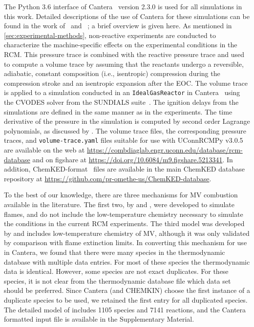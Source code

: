 \documentclass[letterpaper, review, sort&compress]{elsarticle}
\begin{document}
The Python 3.6 interface of Cantera~\cite{cantera} version 2.3.0 is used for all simulations in this
work. Detailed descriptions of the use of Cantera for these simulations can be found in the work
of~\citet{Weber2016a} and~ \citet{Dames2016}; a brief overview is given here. As mentioned in
\cref{sec:experimental-methods}, non-reactive experiments are conducted to characterize the
machine-specific effects on the experimental conditions in the RCM. This pressure trace is combined
with the reactive pressure trace and used to compute a volume trace by assuming that the reactants
undergo a reversible, adiabatic, constant composition (i.e., isentropic) compression during the
compression stroke and an isentropic expansion after the EOC. The volume trace is applied to a
simulation conducted in an \verb|IdealGasReactor| in Cantera~\cite{cantera} using the CVODES solver
from the SUNDIALS suite~\cite{Hindmarsh2005}. The ignition delays from the simulations are defined
in the same manner as in the experiments. The time derivative of the pressure in the simulation is
computed by second order Lagrange polynomials, as discussed by \citet{Chapra2010}. The volume trace
files, the corresponding pressure traces, and \texttt{volume-trace.yaml} files suitable for use with
UConnRCMPy v3.0.5~\cite{uconnrcmpy} are available on the web at
\url{https://combdiaglab.engr.uconn.edu/database/rcm-database} and on figshare at
\url{https://doi.org/10.6084/m9.figshare.5213341}. In addition, ChemKED-format~\cite{Weber2017}
files are available in the main ChemKED database repository at
\url{https://github.com/pr-omethe-us/ChemKED-database}.


To the best of our knowledge, there are three mechanisms for MV combustion available in the
literature. The first two, by \citet{Korobeinichev2015} and \citet{Dmitriev2015}, were developed to
simulate flames, and do not include the low-temperature chemistry necessary to simulate the
conditions in the current RCM experiments. The third model was developed by \citet{Dievart2013} and
includes low-temperature chemistry of MV, although it was only validated by comparison with flame
extinction limits. In converting this mechanism for use in Cantera, we found that there were many
species in the thermodynamic database with multiple data entries. For most of these species the
thermodynamic data is identical. However, some species are not exact duplicates. For these species,
it is not clear from the thermodynamic database file which data set should be preferred. Since
Cantera (and CHEMKIN) choose the first instance of a duplicate species to be used, we retained the
first entry for all duplicated species. The detailed model of \citet{Dievart2013} includes 1105
species and 7141 reactions, and the Cantera formatted input file is available in the Supplementary
Material.
\end{document}
